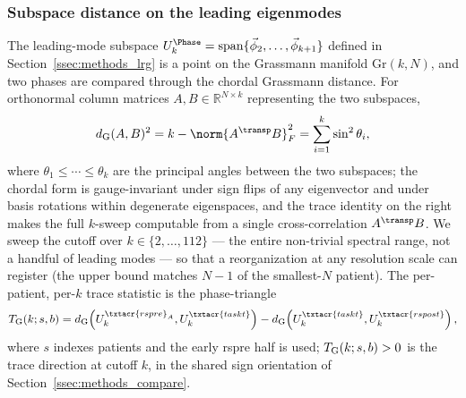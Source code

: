 \subsubsection{Subspace distance on the leading eigenmodes}
    \label{sssec:methods_compare_grassmann}
%
The leading-mode subspace \(U^{\Phase}_{k} = \mathrm{span}\{\vec{\phi}_{2}, \ldots, \vec{\phi}_{k+1}\}\) defined in Section~\ref{ssec:methods_lrg} is a point on the Grassmann manifold \(\mathrm{Gr}(k, N)\), and two phases are compared through the chordal Grassmann distance. For orthonormal column matrices \(A, B \in \mathbb{R}^{N \times k}\) representing the two subspaces,
\begin{equation}
    d_{\rm G}(A, B)^{2} = k - \norm{A^{\transp} B}_{F}^{2} = \sum_{i=1}^{k} \sin^{2}\theta_{i},
    \label{eq:methods_grassmann}
\end{equation}
where \(\theta_{1} \le \cdots \le \theta_{k}\) are the principal angles between the two subspaces; the chordal form is gauge-invariant under sign flips of any eigenvector and under basis rotations within degenerate eigenspaces, and the trace identity on the right makes the full \(k\)-sweep computable from a single cross-correlation \(A^{\transp} B\). We sweep the cutoff over \(k \in \{2, \ldots, 112\}\) --- the entire non-trivial spectral range, not a handful of leading modes --- so that a reorganization at any resolution scale can register (the upper bound matches \(N - 1\) of the smallest-\(N\) patient). The per-patient, per-\(k\) trace statistic is the phase-triangle
\begin{equation}
    T_{\rm G}(k; s, b) = d_{\rm G}\!\left(U^{\txtacr{rspre}_{A}}_{k}, U^{\txtacr{taskt}}_{k}\right) - d_{\rm G}\!\left(U^{\txtacr{taskt}}_{k}, U^{\txtacr{rspost}}_{k}\right),
    \label{eq:methods_T_G}
\end{equation}
where \(s\) indexes patients and the early \acrshort{rspre} half is used; \(T_{\rm G}(k; s, b) > 0\) is the trace direction at cutoff \(k\), in the shared sign orientation of Section~\ref{ssec:methods_compare}.

